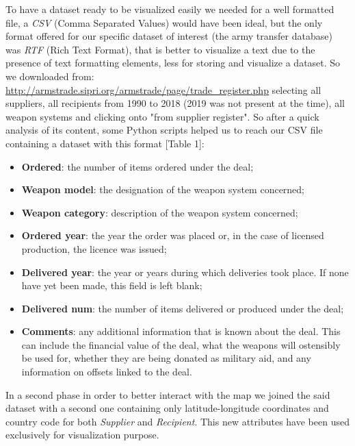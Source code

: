 \documentclass{article}
\begin{document}
\begin{multicols}{2}
To have a dataset ready to be visualized easily we needed for a well formatted file, a \textit{CSV} (Comma Separated Values) would have been ideal, but the only format offered for our specific dataset of interest (the army transfer database) was \textit{RTF} (Rich Text Format), that is better to visualize a text due to the presence of text formatting elements, less for storing and visualize a dataset. So we downloaded from: \url{http://armstrade.sipri.org/armstrade/page/trade_register.php} selecting all suppliers, all recipients from 1990 to 2018 (2019 was not present at the time), all weapon systems and clicking onto "from supplier register". So after a quick analysis of its content, some Python scripts helped us to reach our CSV file containing a dataset with this format [Table 1]:
\begin{itemize}
\item \textbf{Ordered}: the number of items ordered under the deal;
\item \textbf{Weapon model}: the designation of the weapon system concerned;
\item \textbf{Weapon category}: description of the weapon system concerned;
\item \textbf{Ordered year}: the year the order was placed or, in the case of licensed production, the licence was issued;
\item \textbf{Delivered year}: the year or years during which deliveries took place. If none have yet been made, this field is left blank;
\item \textbf{Delivered num}: the number of items delivered or produced under the deal;
\item \textbf{Comments}: any additional information that is known about the deal. This can include the financial value of the deal, what the weapons will ostensibly be used for, whether they are being donated as military aid, and any information on offsets linked to the deal.
 
\end{itemize}



In a second phase in order to better interact with the map we joined the said dataset with a second one containing only latitude-longitude coordinates and country code for both \textit{Supplier} and \textit{Recipient}. This new attributes have been used exclusively for visualization purpose.


\end{multicols}
\end{document}

